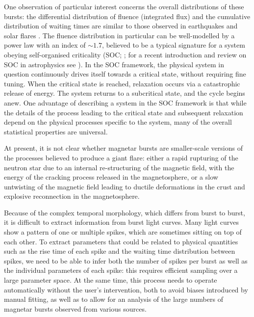 \documentclass[12pt]{emulateapj}
\begin{document}
One observation of particular interest concerns the overall distributions of these bursts: the differential distribution of fluence (integrated flux) and 
the cumulative distribution of waiting times are similar to those observed in earthquakes and solar flares \citep{cheng1996,gogus1999,gogus2000,prieskorn2012}. The fluence distribution
in particular can be well-modelled by a power law with an index of $\sim\!\! 1.7$, believed to be a typical signature for a system obeying 
self-organised criticality (SOC; \citealp{bak1987,bak1988}; for a recent introduction and review on SOC in astrophysics see \citealp{aschwanden2014}). 
In the SOC framework, the physical system in question continuously drives itself towards a critical state,
without requiring fine tuning. When the critical state is reached, relaxation occurs via a catastrophic release of energy. The system returns
to a subcritical state, and the cycle begins anew. 
One advantage of describing a system in the SOC framework is that while the details of the process leading to the critical state and subsequent
relaxation depend on the physical processes specific to the system, many of the overall statistical properties are universal.

At present, it is not clear whether magnetar bursts are smaller-scale versions of the processes believed to produce a giant flare:
either a rapid rupturing of the neutron star due to an internal re-structuring of the magnetic field, with the energy of the cracking process
released in the magnetosphere, or a slow untwisting of the magnetic field leading to ductile deformations in the crust and explosive 
reconnection in the magnetosphere.

Because of the complex temporal morphology, which differs from burst to burst, it is difficult to extract information from burst light curves. 
Many light curves show a pattern of one or multiple spikes, which are sometimes sitting on top of each other. To extract parameters that could be related
to physical quantities such as the rise time of each spike and the waiting time distribution between spikes, we need to be able to infer both the 
number of spikes per burst as well as the individual parameters of each spike: this requires efficient sampling over a large parameter space.
At the same time, this process needs to operate automatically without the user's intervention, both to avoid biases introduced by manual fitting, as well as
 to allow for an analysis of the large numbers of magnetar bursts observed from various sources.
\end{document}
